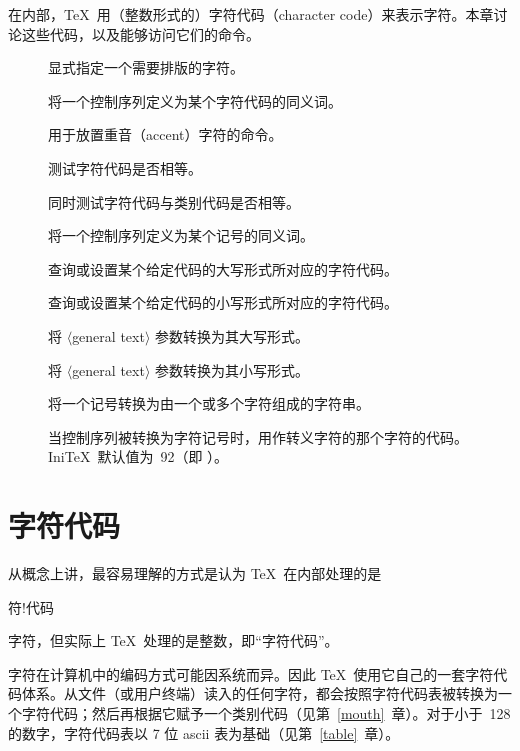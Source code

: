 \documentclass[a4paper]{rapport3}
\def\gr#1{$\langle$#1$\rangle$}\def\key#1{{\tt#1}}
\def\ascii{{\sc ascii}}
\def\IniTeX{Ini\TeX}\def\LamsTeX{LAMS\TeX}\def\VirTeX{Vir\TeX}
\newenvironment{inventory}{\begin{description}}{\end{description}}
\def\term#1\par{\index{#1}}
\begin{document}
在内部，\TeX\ 用（整数形式的）字符代码（character code）来表示字符。本章讨论这些代码，以及能够访问它们的命令。

\begin{inventory}
\item []
      显式指定一个需要排版的字符。

\item []
      将一个控制序列定义为某个字符代码的同义词。

\item []
      用于放置重音（accent）字符的命令。

\item []
      测试字符代码是否相等。

\item []
      同时测试字符代码与类别代码是否相等。

\item []
      将一个控制序列定义为某个记号的同义词。

\item []
      查询或设置某个给定代码的大写形式所对应的字符代码。

\item []
      查询或设置某个给定代码的小写形式所对应的字符代码。

\item []
      将 \gr{general text} 参数转换为其大写形式。

\item []
      将 \gr{general text} 参数转换为其小写形式。

\item []
      将一个记号转换为由一个或多个字符组成的字符串。
\item []
      当控制序列被转换为字符记号时，用作转义字符的那个字符的代码。\IniTeX\ 默认值为~92（即 \cs{}）。
\end{inventory}

\section{字符代码}
\label{char:code}

从概念上讲，最容易理解的方式是认为 \TeX\ 在内部处理的是
\term 字符!代码\par
字符，但实际上 \TeX\ 处理的是整数，即“字符代码”。

字符在计算机中的编码方式可能因系统而异。因此 \TeX\ 使用它自己的一套字符代码体系。从文件（或用户终端）读入的任何字符，都会按照字符代码表被转换为一个字符代码；然后再根据它赋予一个类别代码（见第~\ref{mouth}~章）。对于小于~128 的数字，字符代码表以 7 位 \ascii{} 表为基础（见第~\ref{table}~章）。
\end{document}
